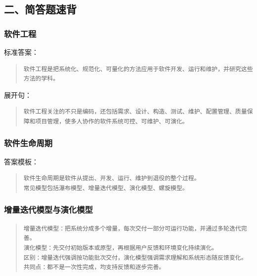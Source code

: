 \documentclass[UTF8,zihao=-4]{ctexart}
\begin{document}
\subsection{二、简答题速背}


\subsubsection{软件工程}


标准答案：


\begin{quote}
\footnotesize
\begin{verbatim}
软件工程是把系统化、规范化、可量化的方法应用于软件开发、运行和维护，并研究这些方法的学科。
\end{verbatim}
\end{quote}


展开句：


\begin{quote}
\footnotesize
\begin{verbatim}
软件工程关注的不只是编码，还包括需求、设计、构造、测试、维护、配置管理、质量保障和项目管理，使多人协作的软件系统可控、可维护、可演化。
\end{verbatim}
\end{quote}


\subsubsection{软件生命周期}


答案模板：


\begin{quote}
\footnotesize
\begin{verbatim}
软件生命周期是软件从提出、开发、运行、维护到退役的整个过程。
常见模型包括瀑布模型、增量迭代模型、演化模型、螺旋模型。
\end{verbatim}
\end{quote}


\subsubsection{增量迭代模型与演化模型}


\begin{quote}
\footnotesize
\begin{verbatim}
增量迭代模型：把系统分成多个增量，每次交付一部分可运行功能，并通过多轮迭代完善。
演化模型：先交付初始版本或原型，再根据用户反馈和环境变化持续演化。
区别：增量迭代强调按功能批次交付，演化模型强调需求理解和系统形态随反馈变化。
共同点：都不是一次性完成，均支持反馈和逐步完善。
\end{verbatim}
\end{quote}
\end{document}
